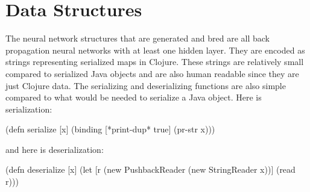 \section{Data Structures}
The neural network structures that are generated and bred are all back propagation neural networks with at least one hidden layer. They are encoded as strings representing serialized maps in Clojure. These strings are relatively small compared to serialized Java objects and are also human readable since they are just Clojure data. The serializing and deserializing functions are also simple compared to what would be needed to serialize a Java object. Here is serialization: 

(defn serialize [x]
  (binding [*print-dup* true] (pr-str x)))

and here is deserialization:

(defn deserialize [x]
  (let [r (new PushbackReader (new StringReader x))]
    (read r)))


